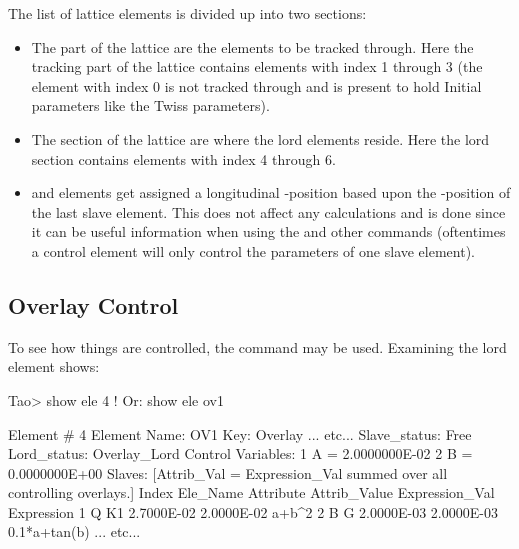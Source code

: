 \documentclass{hitec}     %
\begin{document}
{{{{The list of lattice elements is divided up into two sections:
\vspace{-5 pt}
\begin{itemize}[leftmargin=*]
\item
The  part of the lattice are the elements to be tracked through. Here the tracking
part of the lattice contains elements with index 1 through 3 (the  element with index
0 is not tracked through and is present to hold Initial parameters like the Twiss parameters).
%
\item
The  section of the lattice are where the lord elements reside.  Here the lord section contains
elements with index 4 through 6.
%
\item
{} and  elements get assigned a longitudinal -position based upon the
-position of the last slave element. This does not affect any calculations and is done since it
can be useful information when using the  and other  commands (oftentimes a control
element will only control the parameters of one slave element).
\end{itemize}

\newpage

\subsection{Overlay Control}

To see how things are controlled, the  command may be used. Examining the lord  element shows:
\begin{code}
Tao> show ele 4    ! Or: show ele ov1

 Element #                4
 Element Name: OV1
 Key: Overlay
... etc...
Slave_status: Free
Lord_status:  Overlay_Lord
Control Variables:
    1   A                                         =  2.0000000E-02
    2   B                                         =  0.0000000E+00
Slaves: [Attrib_Val = Expression_Val summed over all controlling overlays.]
   Index   Ele_Name   Attribute Attrib_Value  Expression_Val    Expression
       1   Q          K1          2.7000E-02      2.0000E-02    a+b^2
       2   B          G           2.0000E-03      2.0000E-03    0.1*a+tan(b)
... etc...
\end{code}

}}}}
\end{document}
